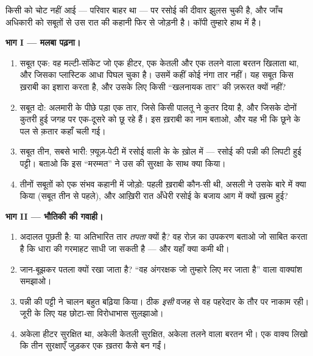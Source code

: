 \begin{problem}\label{pb:g7:short-circuits-safety:1}
किसी को चोट नहीं आई --- परिवार बाहर था --- पर रसोई की दीवार झुलस चुकी
है, और जाँच अधिकारी को सबूतों से उस रात की कहानी फिर से जोड़नी है।
कॉपी तुम्हारे हाथ में है।

\medskip\noindent\textbf{भाग I --- मलबा पढ़ना।}
\begin{enumerate}
  \item सबूत एक: वह मल्टी-सॉकेट जो एक हीटर, एक केतली और एक तलने वाला
        बरतन खिलाता था, और जिसका प्लास्टिक आधा पिघल चुका है। उसमें
        कहीं कोई नंगा तार नहीं। यह सबूत किस ख़राबी का इशारा करता है,
        और उसके लिए किसी ``खलनायक तार'' की ज़रूरत क्यों नहीं?
  \item सबूत दो: अलमारी के पीछे पड़ा एक तार, जिसे किसी पालतू ने कुतर
        दिया है, और जिसके दोनों  कुतरी हुई जगह पर एक-दूसरे को छू
        रहे हैं। इस ख़राबी का नाम बताओ, और यह भी कि छूने के पल से
        क़तार कहाँ चली गई।
  \item सबूत तीन, सबसे भारी: फ़्यूज़-पेटी में रसोई वाली  के
         के ख़ोल में --- रसोई की पन्नी की लिपटी हुई पट्टी।
        बताओ कि इस ``मरम्मत'' ने उस  की सुरक्षा के साथ क्या किया।
  \item तीनों सबूतों को एक संभव कहानी में जोड़ो: पहली ख़राबी कौन-सी
        थी, असली  ने उसके बारे में क्या किया (सबूत तीन से
        पहले), और आख़िरी रात अँधेरी रसोई के बजाय आग में क्यों ख़त्म
        हुई?
\end{enumerate}

\medskip\noindent\textbf{भाग II --- भौतिकी की गवाही।}
\begin{enumerate}[resume]
  \item अदालत पूछती है:  या अतिभारित तार \emph{तपता} क्यों
        है? वह रोज़ का उपकरण बताओ जो साबित करता है कि धारा की गरमाहट
        साधी जा सकती है --- और यहाँ क्या कमी थी।
  \item {} जान-बूझकर पतला क्यों रखा जाता है? ``वह अंगरक्षक जो
        तुम्हारे लिए मर जाता है'' वाला वाक्यांश समझाओ।
  \item पन्नी की पट्टी ने चालन बहुत बढ़िया किया। ठीक \emph{इसी} वजह
        से वह पहरेदार के तौर पर नाकाम रही। जूरी के लिए यह छोटा-सा
        विरोधाभास सुलझाओ।
  \item अकेला हीटर सुरक्षित था, अकेली केतली सुरक्षित, अकेला तलने वाला
        बरतन भी। एक वाक्य लिखो कि तीन सुरक्षाएँ जुड़कर एक ख़तरा कैसे
        बन गईं।
\end{enumerate}


\end{problem}
